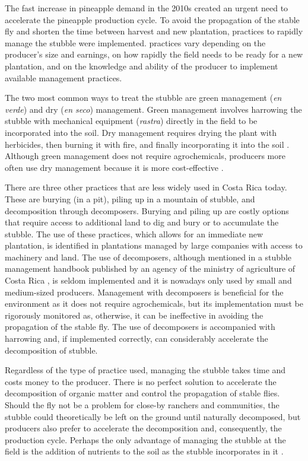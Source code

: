 The fast increase in pineapple demand in the 2010s created an urgent need to accelerate the pineapple production cycle. To avoid the propagation of the stable fly and shorten the time between harvest and new plantation, practices to rapidly manage the stubble were implemented. practices vary depending on the producer's size and earnings, on how rapidly the field needs to be ready for a new plantation, and on the knowledge and ability of the producer to implement available management practices.

The two most common ways to treat the stubble are green management (\textit{en verde}) and dry (\textit{en seco}) management. Green management involves harrowing the stubble with mechanical equipment (\textit{rastra}) directly in the field to be incorporated into the soil. Dry management requires drying the plant with herbicides, then burning it with fire, and finally incorporating it into the soil \citep{pineChaverri2022}. Although green management does not require agrochemicals, producers more often use dry management because it is more cost-effective \citep{hernandez2018impacto}. 

There are three other practices that are less widely used in Costa Rica today. These are burying (in a pit), piling up in a mountain of stubble, and decomposition through decomposers. Burying and piling up are costly options that require access to additional land to dig and bury or to accumulate the stubble. The use of these practices, which allows for an immediate new plantation, is identified in plantations managed by large companies with access to machinery and land. The use of decomposers, although mentioned in a stubble management handbook published by an agency of the ministry of agriculture of Costa Rica \citep{gonzalezMAG2012}, is seldom implemented and it is nowadays only used by small and medium-sized producers. Management with decomposers is beneficial for the environment as it does not require agrochemicals, but its implementation must be rigorously monitored as, otherwise, it can be ineffective in avoiding the propagation of the stable fly. The use of decomposers is accompanied with harrowing and, if implemented correctly, can considerably accelerate the decomposition of stubble. 

Regardless of the type of practice used, managing the stubble takes time and costs money to the producer. There is no perfect solution to accelerate the decomposition of organic matter and control the propagation of stable flies. Should the fly not be a problem for close-by ranchers and communities, the stubble could theoretically be left on the ground until naturally decomposed, but producers also prefer to accelerate the decomposition and, consequently, the production cycle. Perhaps the only advantage of managing the stubble at the field is the addition of nutrients to the soil as the stubble incorporates in it \citep{liu2013effects}.

